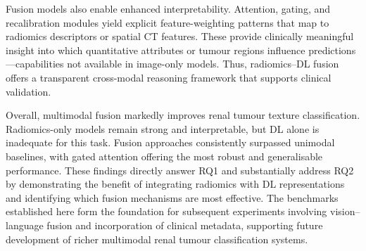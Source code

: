 \documentclass[final,british,a4paper,12pt]{phdthesis}
\begin{document}
Fusion models also enable enhanced interpretability. Attention, gating, and recalibration modules yield explicit feature-weighting patterns that map to radiomics descriptors or spatial CT features. These provide clinically meaningful insight into which quantitative attributes or tumour regions influence predictions—capabilities not available in image-only models. Thus, radiomics–DL fusion offers a transparent cross-modal reasoning framework that supports clinical validation.

Overall, multimodal fusion markedly improves renal tumour texture classification. Radiomics-only models remain strong and interpretable, but DL alone is inadequate for this task. Fusion approaches consistently surpassed unimodal baselines, with gated attention offering the most robust and generalisable performance. These findings directly answer RQ1 and substantially address RQ2 by demonstrating the benefit of integrating radiomics with DL representations and identifying which fusion mechanisms are most effective. The benchmarks established here form the foundation for subsequent experiments involving vision–language fusion and incorporation of clinical metadata, supporting future development of richer multimodal renal tumour classification systems.

















\end{document}

